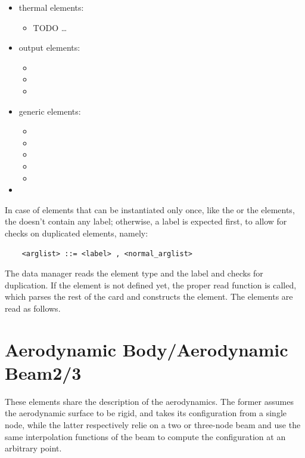 \begin{itemize}
\item thermal elements:
\begin{itemize}
\item TODO \ldots
\end{itemize}

\item output elements:
\begin{itemize}
\item {}
\item {}
\item {}
\end{itemize}

\item generic elements:
\begin{itemize}
\item {}
\item {}
\item {}
\item {}
\item {}
\end{itemize}

\item {}
\end{itemize}


In case of elements that can be instantiated only once, like
the  or the  elements, the 
doesn't contain any label; otherwise, a label is expected first, to allow 
for checks on duplicated elements, namely: 
\begin{verbatim}
    <arglist> ::= <label> , <normal_arglist>
\end{verbatim}
The data manager reads the element type and the label and checks for
duplication. If the element is not defined yet, the proper read function is
called, which parses the rest of the card and constructs the element.
The elements are read as follows.



\section{Aerodynamic Body/Aerodynamic Beam2/3}
\label{sec:EL:AERODYNAMIC}
These elements share the description of the aerodynamics.
The former assumes the aerodynamic surface to be rigid,
and takes its configuration from a single node, while the latter
respectively relie on a two or three-node beam
and use the same interpolation functions of the beam to compute
the configuration at an arbitrary point.

